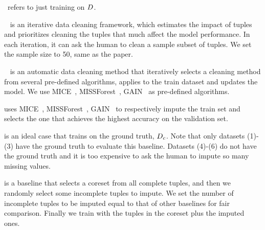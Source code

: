 
~refers to just training on $D$.

~\cite{DBLP:journals/pvldb/KrishnanWWFG16} is an iterative data cleaning framework, which estimates the impact of tuples  and prioritizes cleaning the tuples that much affect the model performance. In each iteration, it can ask the human to clean a sample subset of tuples. We set the sample size to 50, same as the paper. 

~\cite{DBLP:journals/corr/abs-1711-01299} is an automatic  data cleaning method that iteratively selects a cleaning method from several pre-defined algorithms, applies to the train dataset and  updates the model.  We use MICE~\cite{royston2011multiple}, MISSForest~\cite{DBLP:journals/bioinformatics/StekhovenB12}, GAIN~\cite{DBLP:conf/icml/YoonJS18} as pre-defined algorithms.


  uses MICE~\cite{royston2011multiple}, MISSForest~\cite{DBLP:journals/bioinformatics/StekhovenB12}, GAIN~\cite{DBLP:conf/icml/YoonJS18} to respectively impute the train set and selects the one that achieves the highest accuracy on the validation set.

 is an ideal case that trains on the ground truth, \ie $D_c$. Note that only datasets (1)-(3) have the ground truth to evaluate this baseline.  Datasets (4)-(6) do not have the ground truth and it is  too expensive to ask the human to impute so many missing values.

 is a baseline that selects a coreset from all complete tuples, and then we randomly select some incomplete tuples to impute. We set the number of incomplete tuples to be imputed equal to that of  other baselines for fair comparison. Finally we train with the tuples in the coreset plus the  imputed ones.






